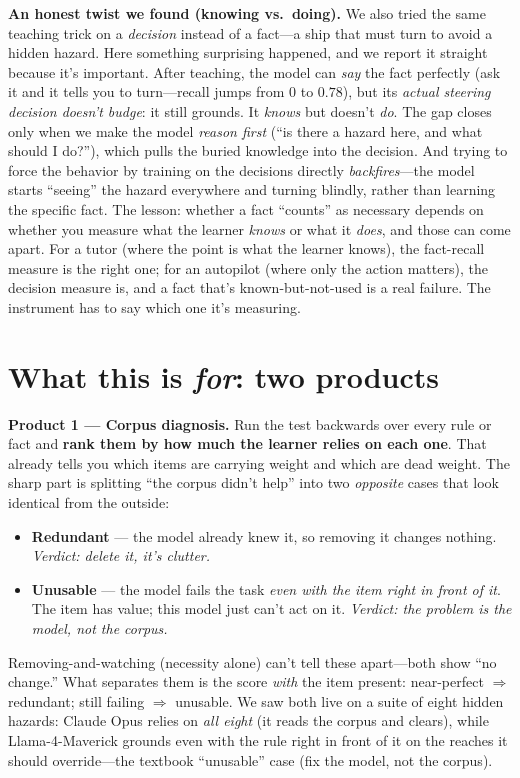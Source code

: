 \documentclass[11pt]{article}
\begin{document}
\textbf{An honest twist we found (knowing vs.\ doing).} We also tried the same teaching trick on a
\emph{decision} instead of a fact---a ship that must turn to avoid a hidden hazard. Here something
surprising happened, and we report it straight because it's important. After teaching, the model
can \emph{say} the fact perfectly (ask it and it tells you to turn---recall jumps from $0$ to
$0.78$), but its \emph{actual steering decision doesn't budge}: it still grounds. It \emph{knows}
but doesn't \emph{do}. The gap closes only when we make the model \emph{reason first} (``is there a
hazard here, and what should I do?''), which pulls the buried knowledge into the decision. And
trying to force the behavior by training on the decisions directly \emph{backfires}---the model
starts ``seeing'' the hazard everywhere and turning blindly, rather than learning the specific
fact. The lesson: whether a fact ``counts'' as necessary depends on whether you measure what the
learner \emph{knows} or what it \emph{does}, and those can come apart. For a tutor (where the point
is what the learner knows), the fact-recall measure is the right one; for an autopilot (where only
the action matters), the decision measure is, and a fact that's known-but-not-used is a real
failure. The instrument has to say which one it's measuring.

\section*{What this is \emph{for}: two products}

\textbf{Product 1 --- Corpus diagnosis.} Run the test backwards over every rule or fact and
\textbf{rank them by how much the learner relies on each one}. That already tells you which items
are carrying weight and which are dead weight. The sharp part is splitting ``the corpus didn't
help'' into two \emph{opposite} cases that look identical from the outside:
\begin{itemize}[leftmargin=1.4em]
  \item \textbf{Redundant} --- the model already knew it, so removing it changes nothing.
  \emph{Verdict: delete it, it's clutter.}
  \item \textbf{Unusable} --- the model fails the task \emph{even with the item right in front of
  it}. The item has value; this model just can't act on it. \emph{Verdict: the problem is the
  model, not the corpus.}
\end{itemize}
Removing-and-watching (necessity alone) can't tell these apart---both show ``no change.'' What
separates them is the score \emph{with} the item present: near-perfect $\Rightarrow$ redundant;
still failing $\Rightarrow$ unusable. We saw both live on a suite of eight hidden hazards: Claude
Opus relies on \emph{all eight} (it reads the corpus and clears), while Llama-4-Maverick grounds
even with the rule right in front of it on the reaches it should override---the textbook
``unusable'' case (fix the model, not the corpus).
\end{document}
